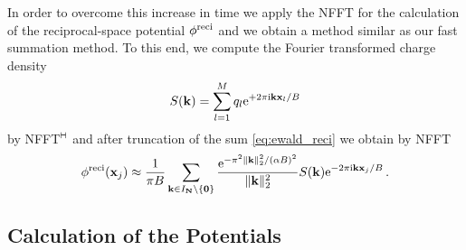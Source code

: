 In order to overcome this increase in time we apply the NFFT for the calculation of the
reciprocal-space potential  $\phi^{\rm reci}$ and we obtain a method similar as our fast summation method.
To this end, we compute the Fourier transformed charge density
\begin{equation*}
 S(\mathbf k) = \sum_{l=1}^M q_l {\rm e}^{+2\pi {\rm i} \mathbf k \mathbf x_l/B}
\end{equation*}
by NFFT$^{\vdash \hspace*{-1.72mm} \dashv}$ and after truncation of the sum \eqref{eq:ewald_reci} we obtain by NFFT
\begin{equation*}
 \phi^{\rm reci}(\mathbf x_j) \approx
 \frac{1}{\pi B} \sum_{\mathbf k\in I_{\mathbf N}\setminus\{\mathbf 0\}}
 \frac{{\rm e}^{-\pi^2 \|\mathbf k\|_2^2/(\alpha B)^2}}{\|\mathbf k\|_2^2}
 S(\mathbf k){\rm e}^{-2\pi {\rm i} \mathbf k \mathbf x_j/B}\, .
\end{equation*}





\subsection{Calculation of the Potentials}

